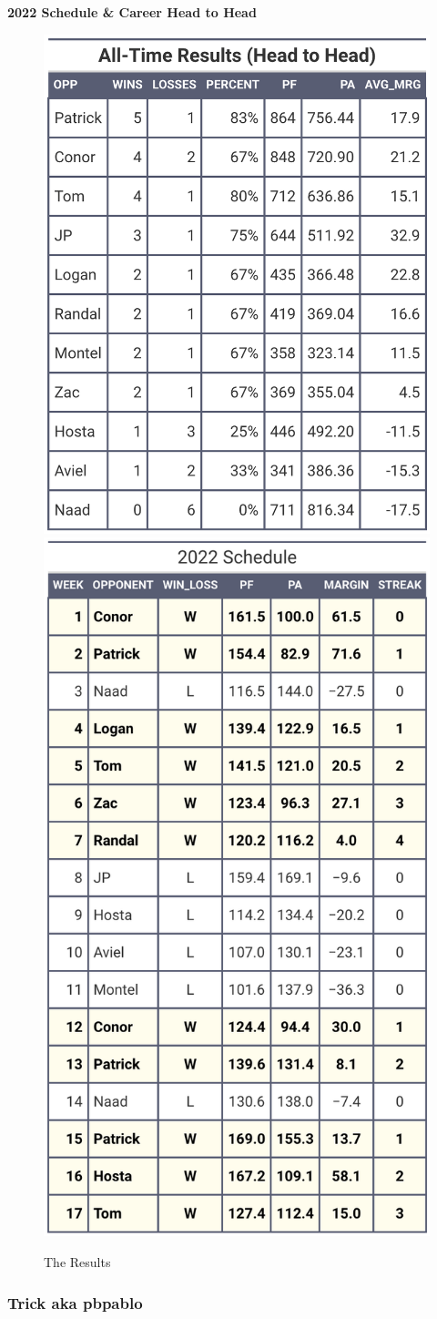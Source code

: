 \documentclass[
]{article}
\begin{document}
\textbf{2022 Schedule \& Career Head to Head}

\begin{figure}
\includegraphics[width=0.5\linewidth,height=0.5\textheight]{output/headtohead/Tommy_head_to_head} \includegraphics[width=0.5\linewidth,height=0.5\textheight]{output/py_schedule/season_results_Tommy} \caption{The Results}\label{fig:unnamed-chunk-34}
\end{figure}

\hypertarget{trick-aka-pbpablo}{%
\subsubsection{Trick aka pbpablo}\label{trick-aka-pbpablo}}
\end{document}
